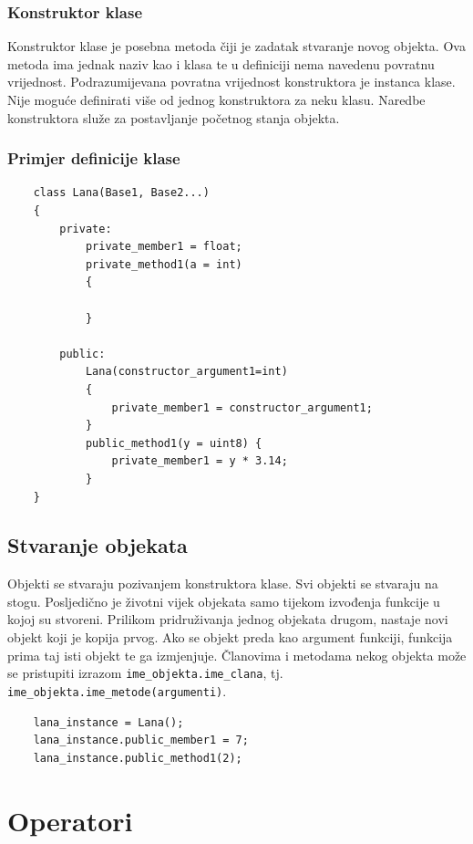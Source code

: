 \documentclass[times, utf8, zavrsni]{fer}
\begin{document}
\subsubsection{Konstruktor klase}
Konstruktor klase je posebna metoda čiji je zadatak stvaranje novog objekta. Ova metoda ima jednak naziv kao i klasa te u definiciji nema navedenu povratnu vrijednost.
Podrazumijevana povratna vrijednost konstruktora je instanca klase. Nije moguće definirati više od jednog konstruktora za neku klasu. Naredbe konstruktora služe za postavljanje početnog stanja objekta.

\subsubsection{Primjer definicije klase}
\begin{verbatim}
    class Lana(Base1, Base2...)
    {
        private:
            private_member1 = float;
            private_method1(a = int)
            {

            }
        
        public:
            Lana(constructor_argument1=int)
            {
                private_member1 = constructor_argument1;
            }
            public_method1(y = uint8) {
                private_member1 = y * 3.14;
            }
    }
\end{verbatim}

\subsection{Stvaranje objekata}
Objekti se stvaraju pozivanjem konstruktora klase. Svi objekti se stvaraju na stogu. Posljedično je životni vijek objekata samo tijekom izvođenja funkcije u kojoj su stvoreni.
Prilikom pridruživanja jednog objekata drugom, nastaje novi objekt koji je kopija prvog. Ako se objekt preda kao argument funkciji, funkcija prima taj isti objekt te
ga izmjenjuje. Članovima i metodama nekog objekta može se pristupiti izrazom \verb|ime_objekta.ime_clana|, tj. \verb|ime_objekta.ime_metode(argumenti)|.

\begin{verbatim}
    lana_instance = Lana();
    lana_instance.public_member1 = 7;
    lana_instance.public_method1(2);
\end{verbatim}

\section{Operatori}
\end{document}
